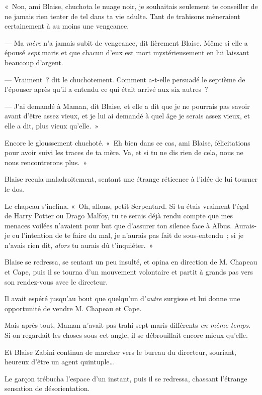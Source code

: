 «~Non, ami Blaise, chuchota le nuage noir, je souhaitais seulement te conseiller de ne jamais rien tenter de tel dans ta vie adulte. Tant de trahisons mèneraient certainement à au moins une vengeance.

--- Ma \emph{mère} n'a jamais subit de vengeance, dit fièrement Blaise. Même si elle a épousé \emph{sept} maris et que chacun d'eux est mort mystérieusement en lui laissant beaucoup d'argent.

--- Vraiment~? dit le chuchotement. Comment a-t-elle persuadé le septième de l'épouser après qu'il a entendu ce qui était arrivé aux six autres~?

--- J'ai demandé à Maman, dit Blaise, et elle a dit que je ne pourrais pas savoir avant d'être assez vieux, et je lui ai demandé à quel âge je serais assez vieux, et elle a dit, plus vieux qu'elle.~»

Encore le gloussement chuchoté. «~Eh bien dans ce cas, ami Blaise, félicitations pour avoir suivi les traces de ta mère. Va, et si tu ne dis rien de cela, nous ne nous rencontrerons plus.~»

Blaise recula maladroitement, sentant une étrange réticence à l'idée de lui tourner le dos.

Le chapeau s'inclina. «~Oh, allons, petit Serpentard. Si tu étais vraiment l'égal de Harry Potter ou Drago Malfoy, tu te serais déjà rendu compte que mes menaces voilées n'avaient pour but que d'assurer ton silence face à Albus. Aurais-je eu l'intention de te faire du mal, je n'aurais pas fait de sous-entendu~; si je n'avais rien dit, \emph{alors} tu aurais dû t'inquiéter.~»

Blaise se redressa, se sentant un peu insulté, et opina en direction de M. Chapeau et Cape, puis il se tourna d'un mouvement volontaire et partit à grands pas vers son rendez-vous avec le directeur.

Il avait espéré jusqu'au bout que quelqu'un d'\emph{autre} surgisse et lui donne une opportunité de vendre M. Chapeau et Cape.

Mais après tout, Maman n'avait pas trahi sept maris différents \emph{en même temps}. Si on regardait les choses sous cet angle, il se débrouillait encore mieux qu'elle.

Et Blaise Zabini continua de marcher vers le bureau du directeur, souriant, heureux d'être un agent quintuple…

Le garçon trébucha l'espace d'un instant, puis il se redressa, chassant l'étrange sensation de désorientation.

